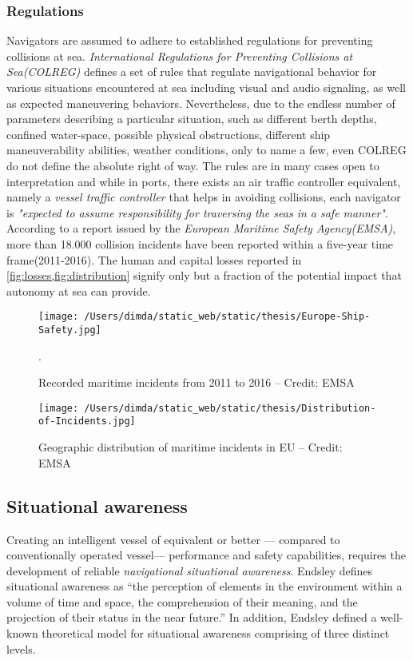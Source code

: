 \subsubsection{Regulations}
Navigators are assumed to adhere to established regulations for preventing collisions at sea. \emph{International Regulations for Preventing Collisions at Sea(COLREG)} defines a set of rules that regulate navigational behavior for various situations encountered at sea including visual and audio signaling,  as well as expected maneuvering behaviors. Nevertheless, due to the endless number of parameters describing a particular situation, such as different berth depths, confined water-space, possible physical obstructions, different ship maneuverability abilities, weather conditions, only to name a few, even COLREG do not define the absolute right of way. The rules are in many cases open to interpretation and while in ports, there exists an air traffic controller equivalent, namely a \emph{vessel traffic controller} that helps in avoiding collisions, each navigator is \textit{"expected to assume responsibility for traversing the seas in a safe manner"}. According to a report issued by the \emph{European Maritime Safety Agency(EMSA)}, more than 18.000 collision incidents have been reported within a five-year time frame(2011-2016). The human and capital losses reported in \cref{fig:losses,fig:distribution} signify only but a fraction of the potential impact that autonomy at sea can provide.

\begin{figure}[H]
	\centering
	\texttt{[image: /Users/dimda/static\_web/static/thesis/Europe-Ship-Safety.jpg]}
	\caption{Recorded maritime incidents from 2011 to 2016 – Credit: EMSA}.
	\label{fig:losses}
\end{figure}


\begin{figure}[H]
	\centering
	\texttt{[image: /Users/dimda/static\_web/static/thesis/Distribution-of-Incidents.jpg]}
	\caption{Geographic distribution of maritime incidents in EU – Credit: EMSA}
	\label{fig:distribution}
\end{figure}

\subsection{Situational awareness}
Creating an intelligent vessel of equivalent or better --- compared to conventionally operated vessel--- performance and safety capabilities, requires the development of reliable \emph{navigational situational awareness}. Endsley \cite{Endsley1995} defines situational awareness as “the perception of elements in the environment within a volume of time and space, the comprehension of their meaning, and the projection of their status in the near future.”  In addition, Endsley defined a well-known theoretical model for situational awareness \cite{Endsley2001,Endsley1995} comprising of three distinct levels.

